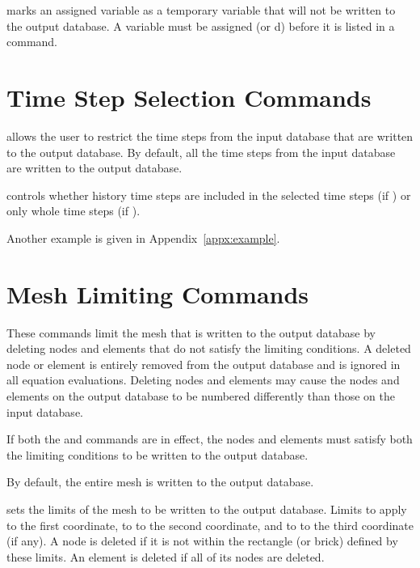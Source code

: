 \newpage %
 {
 marks an assigned variable as a temporary variable that
will not be written to the output database. A variable must be assigned
(or d) before it is listed in a  command.
}

\newpage
\section{Time Step Selection Commands} \label{cmd:timesel}

\caps{\PROGRAM} allows the user to restrict the time steps from the
input database that are written to the output database. By default, all
the time steps from the input database are written to the output
database.







 {
 controls whether history time steps are included in the
selected time steps (if ) or only whole time steps (if
).
}



Another example is given in Appendix~\ref{appx:example}.

\newpage
\section{Mesh Limiting Commands} \label{cmd:meshlimit}

These commands limit the mesh that is written to the output database by
deleting nodes and elements that do not satisfy the limiting conditions.
A deleted node or element is entirely removed from the output database
and is ignored in all equation evaluations. Deleting nodes and elements
may cause the nodes and elements on the output database to be numbered
differently than those on the input database.

If both the  and  commands are in effect, the
nodes and elements must satisfy both the limiting conditions to be
written to the output database.

By default, the entire mesh is written to the output database.

 {
 sets the limits of the mesh to be written to the output
database. Limits  to  apply to the first
coordinate,  to  to the second coordinate, and
 to  to the third coordinate (if any). A node is
deleted if it is not within the rectangle (or brick) defined by these
limits. An element is deleted if all of its nodes are deleted.
}

